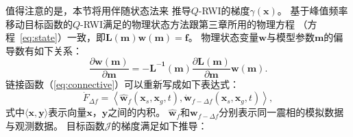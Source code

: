 值得注意的是，本节将用伴随状态法来
推导$Q$-RWI的梯度$\gamma(\mathbf{x})$。
基于峰值频率移动目标函数的$Q$-RWI满足的物理状态方法跟第三章所用的物理方程
（方程~\ref{eq:state}）一致，即$\mathbf{L(m)}\mathbf{w(m)}=\mathbf{f}$。
物理状态变量$\mathbf{w}$与模型参数$\mathbf{m}$的偏导数有如下关系：
\begin{equation}
		\frac{\partial\mathbf{w(m)}}{\partial\mathbf{m}}=
		-\mathbf{L^{-1}(m)}\frac{\partial \mathbf{L(m)}}{\partial\mathbf{m}}\mathbf{w(m)}.
	\label{eq:ad_state}
\end{equation}
链接函数（\ref{eq:connective}）可以重新写成如下表达式：
\begin{equation}
	\dot{F}_{\Delta f}=\left\langle \hat{\mathbf{w}}_f(\mathbf{x}_s,\mathbf{x}_g,t),
	\dot{\mathbf{w}}_{f-\Delta f}(\mathbf{x}_s,\mathbf{x}_g,t) \right\rangle,
\end{equation}
式中$\langle \mathbf{x},\mathbf{y}\rangle$表示向量$\mathbf{x}$，$\mathbf{y}$之间的内积。
$\hat{\mathbf{w}}_f$和$\mathbf{w}_{f-\Delta f}$分别表示同一震相的模拟数据与观测数据。
目标函数$\mathcal{J}$的梯度满足如下推导：
